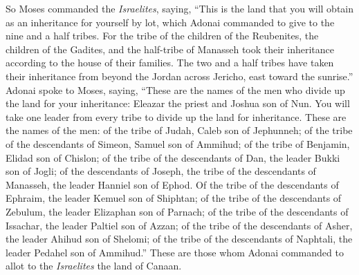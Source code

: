 \begin{biblechapter}
\verse So Moses commanded the \textit{Israelites}, saying, “This is the land that you will obtain as an inheritance for yourself by lot, which Adonai commanded to give to the nine and a half tribes.
\verse For the tribe of the children of the Reubenites, the children of the Gadites, and the half-tribe of Manasseh took their inheritance according to the house of their families.
\verse The two and a half tribes have taken their inheritance from beyond the Jordan across Jericho, east toward the sunrise.”
\verse Adonai spoke to Moses, saying,
\verse “These are the names of the men who divide up the land for your inheritance: Eleazar the priest and Joshua son of Nun.
\verse You will take one leader from every tribe to divide up the land for inheritance.
\verse These are the names of the men: of the tribe of Judah, Caleb son of Jephunneh;
\verse of the tribe of the descendants of Simeon, Samuel son of Ammihud;
\verse of the tribe of Benjamin, Elidad son of Chislon;
\verse of the tribe of the descendants of Dan, the leader Bukki son of Jogli;
\verse of the descendants of Joseph, the tribe of the descendants of Manasseh, the leader Hanniel son of Ephod.
\verse Of the tribe of the descendants of Ephraim, the leader Kemuel son of Shiphtan;
\verse of the tribe of the descendants of Zebulum, the leader Elizaphan son of Parnach;
\verse of the tribe of the descendants of Issachar, the leader Paltiel son of Azzan;
\verse of the tribe of the descendants of Asher, the leader Ahihud son of Shelomi;
\verse of the tribe of the descendants of Naphtali, the leader Pedahel son of Ammihud.”
\verse These are those whom Adonai commanded to allot to the \textit{Israelites} the land of Canaan.
\end{biblechapter}


